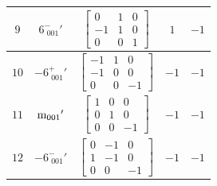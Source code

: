 \documentclass[fleqn,8pt]{jsarticle}
\begin{document}
\begin{longtable}{ccccc}
$ 9 $ & $ 6^{-}_{\,\,001}{}' $ & $ \begin{bmatrix} 0 & 1 & 0 \\ -1 & 1 & 0 \\ 0 & 0 & 1 \end{bmatrix} $ & $ 1 $ & $ -1 $ \\ \hline
$ 10 $ & $ -6^{+}_{\,\,001}{}' $ & $ \begin{bmatrix} -1 & 1 & 0 \\ -1 & 0 & 0 \\ 0 & 0 & -1 \end{bmatrix} $ & $ -1 $ & $ -1 $ \\ \hline
$ 11 $ & $ {\rm m}_{001}{}' $ & $ \begin{bmatrix} 1 & 0 & 0 \\ 0 & 1 & 0 \\ 0 & 0 & -1 \end{bmatrix} $ & $ -1 $ & $ -1 $ \\ \hline
$ 12 $ & $ -6^{-}_{\,\,001}{}' $ & $ \begin{bmatrix} 0 & -1 & 0 \\ 1 & -1 & 0 \\ 0 & 0 & -1 \end{bmatrix} $ & $ -1 $ & $ -1 $ \\
\end{longtable}
\end{document}
